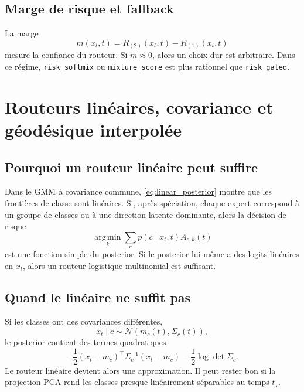 \documentclass[11pt,a4paper]{article}
\newcommand{\argmin}{\operatorname*{arg\,min}}
\newcommand{\1}{\mathbf{1}}
\newcommand{\xt}{x_t}
\begin{document}
\subsection{Marge de risque et fallback}

La marge
\begin{equation}
 m(\xt,t)=R_{(2)}(\xt,t)-R_{(1)}(\xt,t)
\label{eq:risk_margin}
\end{equation}
mesure la confiance du routeur. Si $m\approx 0$, alors un choix dur est arbitraire. Dans ce régime, \texttt{risk\_softmix} ou \texttt{mixture\_score} est plus rationnel que \texttt{risk\_gated}.

\section{Routeurs linéaires, covariance et géodésique interpolée}

\subsection{Pourquoi un routeur linéaire peut suffire}

Dans le GMM à covariance commune, \eqref{eq:linear_posterior} montre que les frontières de classe sont linéaires. Si, après spéciation, chaque expert correspond à un groupe de classes ou à une direction latente dominante, alors la décision de risque
\[
\argmin_k\sum_c p(c\mid\xt,t)A_{c,k}(t)
\]
est une fonction simple du posterior. Si le posterior lui-même a des logits linéaires en $\xt$, alors un routeur logistique multinomial est suffisant.

\subsection{Quand le linéaire ne suffit pas}

Si les classes ont des covariances différentes,
\begin{equation}
\xt\mid c\sim\mathcal N(m_c(t),\Sigma_c(t)),
\end{equation}
le posterior contient des termes quadratiques
\begin{equation}
-\frac12(\xt-m_c)^\top\Sigma_c^{-1}(\xt-m_c)-\frac12\log\det\Sigma_c.
\end{equation}
Le routeur linéaire devient alors une approximation. Il peut rester bon si la projection PCA rend les classes presque linéairement séparables au temps $t_\star$.
\end{document}
